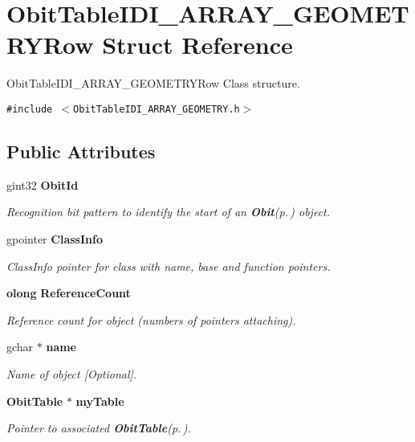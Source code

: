 \section{Obit\-Table\-IDI\_\-ARRAY\_\-GEOMETRYRow Struct Reference}
\label{structObitTableIDI__ARRAY__GEOMETRYRow}
Obit\-Table\-IDI\_\-ARRAY\_\-GEOMETRYRow Class structure.  


{\tt \#include $<$Obit\-Table\-IDI\_\-ARRAY\_\-GEOMETRY.h$>$}

\subsection*{Public Attributes}
\begin{CompactItemize}
\item 
gint32 {\bf Obit\-Id}
\begin{CompactList}\small\item\em Recognition bit pattern to identify the start of an {\bf Obit}{\rm (p.\,\pageref{structObit})} object. \item\end{CompactList}\item 
gpointer {\bf Class\-Info}
\begin{CompactList}\small\item\em Class\-Info pointer for class with name, base and function pointers. \item\end{CompactList}\item 
{\bf olong} {\bf Reference\-Count}
\begin{CompactList}\small\item\em Reference count for object (numbers of pointers attaching). \item\end{CompactList}\item 
gchar $\ast$ {\bf name}
\begin{CompactList}\small\item\em Name of object [Optional]. \item\end{CompactList}\item 
{\bf Obit\-Table} $\ast$ {\bf my\-Table}
\begin{CompactList}\small\item\em Pointer to associated {\bf Obit\-Table}{\rm (p.\,\pageref{structObitTable})}. \item\end{CompactList}\item 

\end{CompactItemize}

